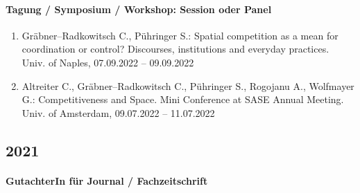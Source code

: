 \paragraph{Tagung / Symposium / Workshop: Session oder Panel}
\begin{enumerate}[leftmargin=*, labelsep=0.5cm]
\item Gräbner--Radkowitsch C., Pühringer S.: Spatial competition as a mean for coordination or control? Discourses, institutions and everyday practices. Univ. of Naples, 07.09.2022 -- 09.09.2022
\item Altreiter C., Gräbner--Radkowitsch C., Pühringer S., Rogojanu A., Wolfmayer G.: Competitiveness and Space. Mini Conference at SASE Annual Meeting. Univ. of Amsterdam, 09.07.2022 -- 11.07.2022
\end{enumerate}\subsection*{2021}\paragraph{GutachterIn für Journal / Fachzeitschrift}
